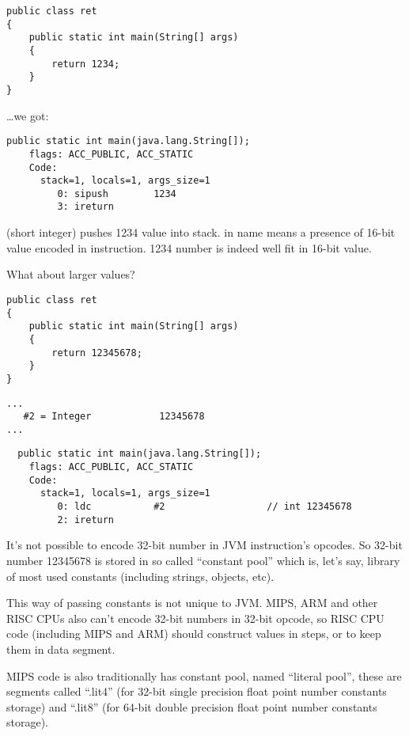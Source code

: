\begin{lstlisting}
public class ret
{
	public static int main(String[] args)
	{
		return 1234;
	}
}
\end{lstlisting}

\dots we got:

\begin{lstlisting}[caption=JDK 1.7 (excerpt)]
  public static int main(java.lang.String[]);
    flags: ACC_PUBLIC, ACC_STATIC
    Code:
      stack=1, locals=1, args_size=1
         0: sipush        1234
         3: ireturn       
\end{lstlisting}

 (short integer) pushes 1234 value into stack.
 in name means a presence of 16-bit value encoded in instruction. 
1234 number is indeed well fit in 16-bit value.

What about larger values?

\begin{lstlisting}
public class ret
{
	public static int main(String[] args) 
	{
		return 12345678;
	}
}
\end{lstlisting}

\begin{lstlisting}[caption=Constant pool]
...
   #2 = Integer            12345678
...
\end{lstlisting}

\begin{lstlisting}
  public static int main(java.lang.String[]);
    flags: ACC_PUBLIC, ACC_STATIC
    Code:
      stack=1, locals=1, args_size=1
         0: ldc           #2                  // int 12345678
         2: ireturn       
\end{lstlisting}

It's not possible to encode 32-bit number in JVM instruction's opcodes.
So 32-bit number 12345678 is stored in so called ``constant pool'' which is, let's say,
library of most used constants (including strings, objects, etc).

This way of passing constants is not unique to JVM. 
MIPS, ARM and other RISC CPUs also can't encode 32-bit numbers
in 32-bit opcode, so RISC CPU code (including MIPS and ARM) should construct values in steps, 
or to keep them in data segment.

MIPS code is also traditionally has constant pool, named ``literal pool'', these are segments
called ``.lit4'' (for 32-bit single precision float point number constants storage) and ``.lit8''
(for 64-bit double precision float point number constants storage).

